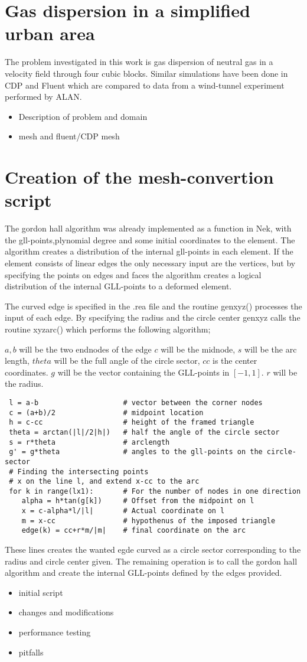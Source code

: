 \section{Gas dispersion in a simplified urban area}
The problem investigated in this work is gas dispersion of neutral gas in a velocity field through four cubic blocks.
Similar simulations have been done in CDP and Fluent which are compared to data from a wind-tunnel experiment performed by ALAN.
\begin{itemize}
	\item Description of problem and domain
	\item mesh and fluent/CDP mesh
\end{itemize}

\section{Creation of the mesh-convertion script}

The gordon hall algorithm was already implemented as a function in Nek, with the gll-points,plynomial degree and some initial 
coordinates to the element. The algorithm creates a distribution of the internal gll-points in each element. 
If the element consists of linear edges the only necessary input are the vertices, but by specifying the points on edges and faces
the algorithm creates a logical distribution of the internal GLL-points to a deformed element. 

The curved edge is specified in the .rea file and the routine genxyz() processes the input of each edge. 
By specifying the radius and the circle center genxyz calls the routine xyzarc() which performs the following algorithm;

    $a,b$ will be the two endnodes of the edge 
    $c$ will be the midnode, $s$ will be the arc length, $theta$ will be the full angle of the circle sector, $cc$ is the center coordinates.
    $g$ will be the vector containing the GLL-points in $[-1,1]$. $r$ will be the radius.
\begin{lstlisting}
 l = a-b                    # vector between the corner nodes
 c = (a+b)/2                # midpoint location
 h = c-cc                   # height of the framed triangle
 theta = arctan(|l|/2|h|)   # half the angle of the circle sector
 s = r*theta                # arclength
 g' = g*theta               # angles to the gll-points on the circle-sector
 # Finding the intersecting points
 # x on the line l, and extend x-cc to the arc 
 for k in range(lx1):       # For the number of nodes in one direction
    alpha = h*tan(g[k])     # Offset from the midpoint on l
    x = c-alpha*l/|l|       # Actual coordinate on l
    m = x-cc                # hypothenus of the imposed triangle
    edge(k) = cc+r*m/|m|    # final coordinate on the arc
\end{lstlisting}
These lines creates the wanted egde curved as a circle sector corresponding to the radius and circle center given.
The remaining operation is to call the gordon hall algorithm and create the internal GLL-points defined by the edges 
provided.


\begin{itemize}
	\item initial script
	\item changes and modifications
	\item performance testing
	\item pitfalls
\end{itemize}


